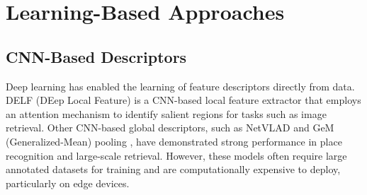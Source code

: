 \documentclass[report.tex]{subfiles}
\begin{document}





\section{Learning-Based Approaches}

\subsection{CNN-Based Descriptors}
Deep learning has enabled the learning of feature descriptors directly from data. DELF (DEep Local Feature) \cite{Noh_2017_ICCV} is a CNN-based local feature extractor that employs an attention mechanism to identify salient regions for tasks such as image retrieval. Other CNN-based global descriptors, such as NetVLAD \cite{arandjelovic2016netvlad} and GeM (Generalized-Mean) pooling \cite{8382272}, have demonstrated strong performance in place recognition and large-scale retrieval. However, these models often require large annotated datasets for training and are computationally expensive to deploy, particularly on edge devices.
\end{document}
